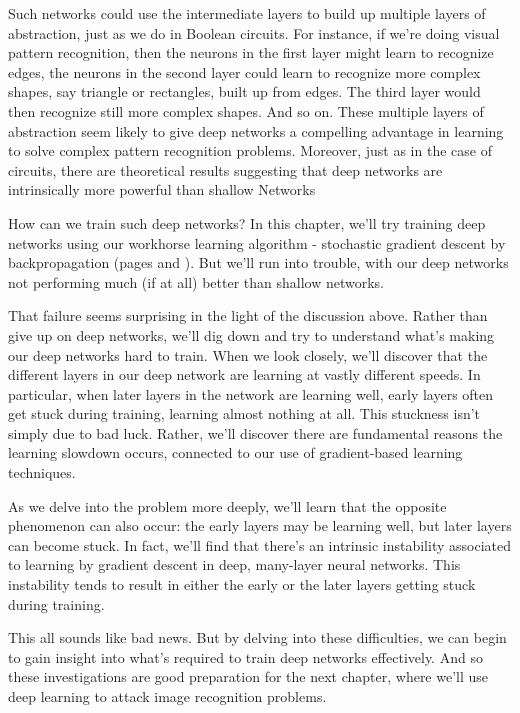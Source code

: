 Such networks could use the intermediate layers to build up multiple layers of abstraction, just as we do in Boolean circuits. For instance, if we're doing visual pattern recognition, then the neurons in the first layer might learn to recognize edges, the neurons in the second layer could learn to recognize more complex shapes, say triangle or rectangles, built up from edges. The third layer would then recognize still more complex shapes. And so on. These multiple layers of abstraction seem likely to give deep networks a compelling advantage in learning to solve complex pattern recognition problems. Moreover, just as in the case of circuits, there are theoretical results suggesting that deep networks are intrinsically more powerful than shallow Networks

How can we train such deep networks? In this chapter, we'll try training deep networks using our workhorse learning algorithm - stochastic gradient descent by backpropagation (pages \pageref{sec:Learningwithgradientdescent} and \pageref{chap:02HowtheBackpropagationAlgorithmWorks}). But we'll run into trouble, with our deep networks not performing much (if at all) better than shallow networks.

That failure seems surprising in the light of the discussion above. Rather than give up on deep networks, we'll dig down and try to understand what's making our deep networks hard to train. When we look closely, we'll discover that the different layers in our deep network are learning at vastly different speeds. In particular, when later layers in the network are learning well, early layers often get stuck during training, learning almost nothing at all. This stuckness isn't simply due to bad luck. Rather, we'll discover there are fundamental reasons the learning slowdown occurs, connected to our use of gradient-based learning techniques.

As we delve into the problem more deeply, we'll learn that the opposite phenomenon can also occur: the early layers may be learning well, but later layers can become stuck. In fact, we'll find that there's an intrinsic instability associated to learning by gradient descent in deep, many-layer neural networks. This instability tends to result in either the early or the later layers getting stuck during training.

This all sounds like bad news. But by delving into these difficulties, we can begin to gain insight into what's required to train deep networks effectively. And so these investigations are good preparation for the next chapter, where we'll use deep learning to attack image recognition problems.


